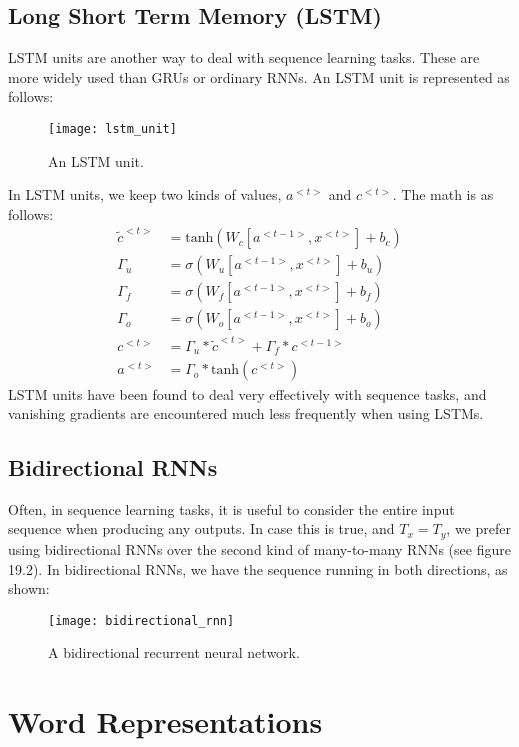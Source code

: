 \documentclass[a4paper, 12pt]{report}
\begin{document}
\section{Long Short Term Memory (LSTM)}
LSTM units are another way to deal with sequence learning tasks. These are more widely used than GRUs or ordinary RNNs. An LSTM unit is represented as follows:
\begin{figure}[H]
\centering
\texttt{[image: lstm\_unit]}
\caption{An LSTM unit.}
\end{figure}
In LSTM units, we keep two kinds of values, $a^{<t>}$ and $c^{<t>}$. The math is as follows:
\begin{align*}
\tilde{c}^{<t>} &= \text{tanh}\left(W_c\left[a^{<t-1>}, x^{<t>}\right] + b_c\right)\\
\Gamma_u &= \sigma\left(W_u\left[a^{<t-1>}, x^{<t>}\right] + b_u\right)\\
\Gamma_f &= \sigma\left(W_f\left[a^{<t-1>}, x^{<t>}\right] + b_f\right)\\
\Gamma_o &= \sigma\left(W_o\left[a^{<t-1>}, x^{<t>}\right] + b_o\right)\\
c^{<t>} &= \Gamma_u*\tilde{c}^{<t>} + \Gamma_f*c^{<t-1>}\\
a^{<t>} &= \Gamma_o*\text{tanh}\left(c^{<t>}\right)
\end{align*}
LSTM units have been found to deal very effectively with sequence tasks, and vanishing gradients are encountered much less frequently when using LSTMs.

\section{Bidirectional RNNs}
Often, in sequence learning tasks, it is useful to consider the entire input sequence when producing any outputs. In case this is true, and $T_x = T_y$, we prefer using bidirectional RNNs over the second kind of many-to-many RNNs (see figure 19.2). In bidirectional RNNs, we have the sequence running in both directions, as shown:
\begin{figure}[H]
\centering
\texttt{[image: bidirectional\_rnn]}
\caption{A bidirectional recurrent neural network.}
\end{figure}


\chapter{Word Representations}
\end{document}
